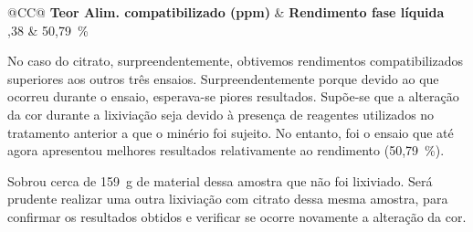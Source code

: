 \begin{table}[!ht]
    \centering
    \begin{tabularx}{\textwidth}{@{}CC@{}}
        \toprule
        \textbf{Teor Alim. compatibilizado (ppm)} & \textbf{Rendimento fase líquida} \\ ,38 & 50,79~\% \\ \bottomrule                  
    \end{tabularx}
    \caption{Teor da alimentação compatibilizado (Citrato).}
    \label{tab:compatibalized-grade-feed-citrato}
\end{table}

No caso do citrato, surpreendentemente, obtivemos rendimentos compatibilizados superiores aos outros três ensaios.
Surpreendentemente porque devido ao que ocorreu durante o ensaio, esperava-se piores resultados.
Supõe-se que a alteração da cor durante a lixiviação seja devido à presença de reagentes utilizados no tratamento anterior a que o minério foi sujeito.
No entanto, foi o ensaio que até agora apresentou melhores resultados relativamente ao rendimento (50,79~\%).

Sobrou cerca de 159~g de material dessa amostra que não foi lixiviado.
Será prudente realizar uma outra lixiviação com citrato dessa mesma amostra, para confirmar os resultados obtidos e verificar se ocorre novamente a alteração da cor.